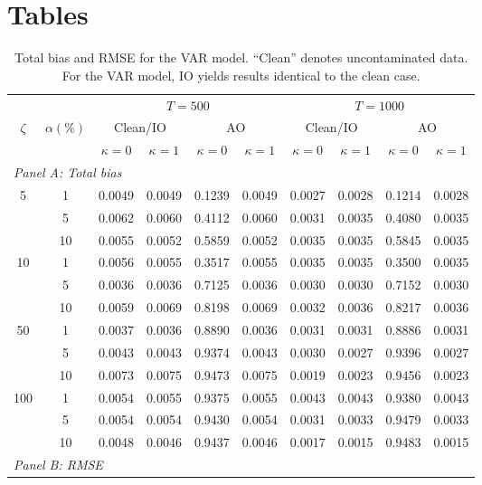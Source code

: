 \documentclass[12pt]{article}
\numberwithin{equation}{section}
\begin{document}
\section{Tables}


\begin{table}[!htbp]
\centering
\caption{Total bias and RMSE for the VAR model. “Clean” denotes uncontaminated data. For the VAR model, IO yields results identical to the clean case.}
\footnotesize
\renewcommand{\arraystretch}{1.1}
\begin{tabular}{cc|cccc|cccc}
\hline
& & \multicolumn{4}{c|}{$T=500$} & \multicolumn{4}{c}{$T=1000$} \\
$\zeta$ & $\alpha(\%)$
& \multicolumn{2}{c}{Clean/IO} & \multicolumn{2}{c|}{AO}
& \multicolumn{2}{c}{Clean/IO} & \multicolumn{2}{c}{AO} \\
& & $\kappa=0$ & $\kappa=1$ & $\kappa=0$ & $\kappa=1$
& $\kappa=0$ & $\kappa=1$ & $\kappa=0$ & $\kappa=1$ \\
\hline
\multicolumn{10}{l}{\textit{Panel A: Total bias}}\\
5   & 1  & 0.0049 & 0.0049 & 0.1239 & 0.0049 & 0.0027 & 0.0028 & 0.1214 & 0.0028 \\
    & 5  & 0.0062 & 0.0060 & 0.4112 & 0.0060 & 0.0031 & 0.0035 & 0.4080 & 0.0035 \\
    & 10 & 0.0055 & 0.0052 & 0.5859 & 0.0052 & 0.0035 & 0.0035 & 0.5845 & 0.0035 \\
10  & 1  & 0.0056 & 0.0055 & 0.3517 & 0.0055 & 0.0035 & 0.0035 & 0.3500 & 0.0035 \\
    & 5  & 0.0036 & 0.0036 & 0.7125 & 0.0036 & 0.0030 & 0.0030 & 0.7152 & 0.0030 \\
    & 10 & 0.0059 & 0.0069 & 0.8198 & 0.0069 & 0.0032 & 0.0036 & 0.8217 & 0.0036 \\
50  & 1  & 0.0037 & 0.0036 & 0.8890 & 0.0036 & 0.0031 & 0.0031 & 0.8886 & 0.0031 \\
    & 5  & 0.0043 & 0.0043 & 0.9374 & 0.0043 & 0.0030 & 0.0027 & 0.9396 & 0.0027 \\
    & 10 & 0.0073 & 0.0075 & 0.9473 & 0.0075 & 0.0019 & 0.0023 & 0.9456 & 0.0023 \\
100 & 1  & 0.0054 & 0.0055 & 0.9375 & 0.0055 & 0.0043 & 0.0043 & 0.9380 & 0.0043 \\
    & 5  & 0.0054 & 0.0054 & 0.9430 & 0.0054 & 0.0031 & 0.0033 & 0.9479 & 0.0033 \\
    & 10 & 0.0048 & 0.0046 & 0.9437 & 0.0046 & 0.0017 & 0.0015 & 0.9483 & 0.0015 \\
\hline
\multicolumn{10}{l}{\textit{Panel B: RMSE}}\\

\end{tabular}
\end{table}
\end{document}
